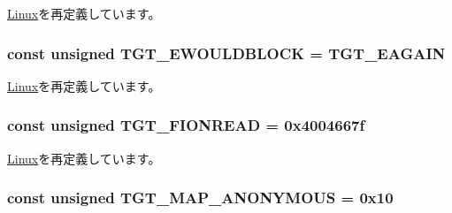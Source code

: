 \hyperlink{classLinux_aefc7de6c39dd68b971f1fe2c797acd04}{Linux}を再定義しています。\hypertarget{classAlphaLinux_ad8327bcce81f6ea29f92e6422808bbdd}{
\subsubsection[{TGT\_\-EWOULDBLOCK}]{\setlength{\rightskip}{0pt plus 5cm}const unsigned {\bf TGT\_\-EWOULDBLOCK} = {\bf TGT\_\-EAGAIN}}}
\label{classAlphaLinux_ad8327bcce81f6ea29f92e6422808bbdd}


\hyperlink{classLinux_ad8327bcce81f6ea29f92e6422808bbdd}{Linux}を再定義しています。\hypertarget{classAlphaLinux_a1def346ff527c8efccfd52463f3b5dc1}{
\subsubsection[{TGT\_\-FIONREAD}]{\setlength{\rightskip}{0pt plus 5cm}const unsigned {\bf TGT\_\-FIONREAD} = 0x4004667f}}
\label{classAlphaLinux_a1def346ff527c8efccfd52463f3b5dc1}


\hyperlink{classLinux_a1def346ff527c8efccfd52463f3b5dc1}{Linux}を再定義しています。\hypertarget{classAlphaLinux_a0bbc267200567dd98250b99b6085a499}{
\subsubsection[{TGT\_\-MAP\_\-ANONYMOUS}]{\setlength{\rightskip}{0pt plus 5cm}const unsigned {\bf TGT\_\-MAP\_\-ANONYMOUS} = 0x10}}
\label{classAlphaLinux_a0bbc267200567dd98250b99b6085a499}


